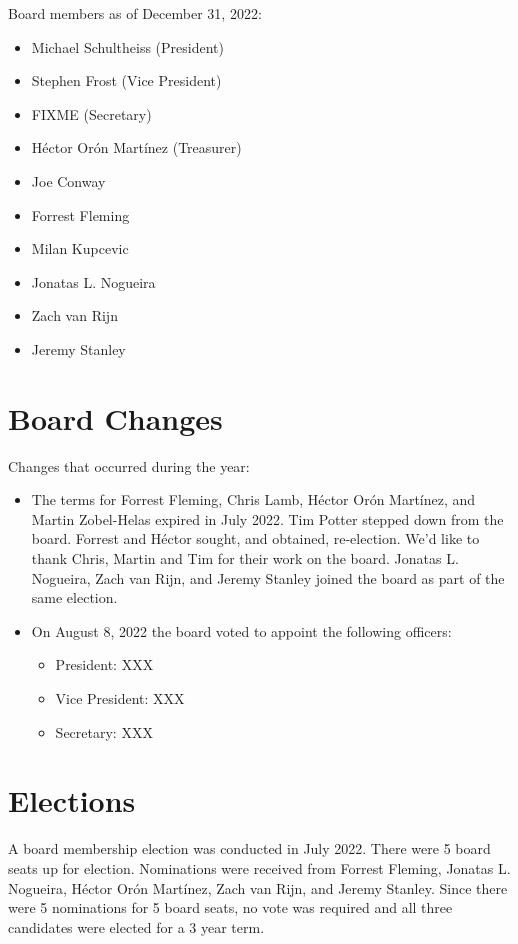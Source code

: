 \documentclass[a4paper]{report}
\begin{document}
Board members as of December 31, 2022:

\begin{itemize}
\item Michael Schultheiss (President)
\item Stephen Frost (Vice President)
\item FIXME (Secretary)
\item Héctor Orón Martínez (Treasurer)
\item Joe Conway
\item Forrest Fleming
\item Milan Kupcevic
\item Jonatas L. Nogueira
\item Zach van Rijn
\item Jeremy Stanley
\end{itemize}

\section{Board Changes}

Changes that occurred during the year:

\begin{itemize}

\item The terms for Forrest Fleming, Chris Lamb, Héctor Orón Martínez, and Martin Zobel-Helas expired in July 2022.  Tim Potter stepped down from the board.  Forrest and Héctor sought, and obtained, re-election.   We'd like to thank Chris, Martin and Tim for their work on the board.  Jonatas L. Nogueira, Zach van Rijn, and Jeremy Stanley joined the board as part of the same election.

\item On August 8, 2022 the board voted to appoint the following officers:

\begin{itemize}
\item President: XXX
\item Vice President: XXX
\item Secretary: XXX
\end{itemize}

\end{itemize}

\section{Elections}

A board membership election was conducted in July 2022.  There were 5 board seats up for election.  Nominations were received from Forrest Fleming, Jonatas L. Nogueira, Héctor Orón Martínez, Zach van Rijn, and Jeremy Stanley.  Since there were 5 nominations for 5 board seats, no vote was required and all three candidates were elected for a 3 year term.
\end{document}
